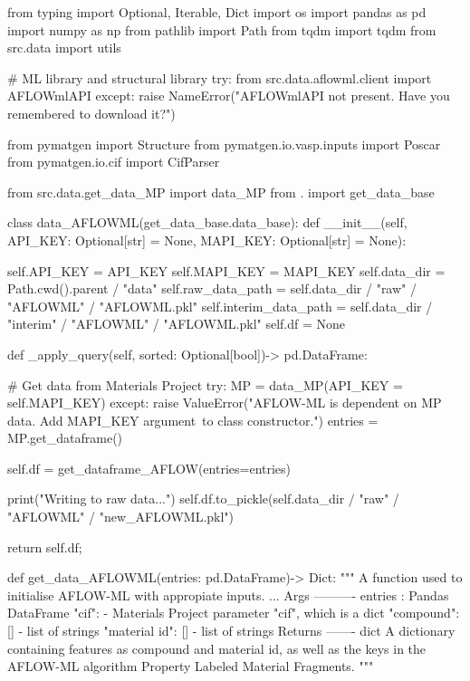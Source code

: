 from typing import Optional, Iterable, Dict
import os
import pandas as pd
import numpy as np
from pathlib import Path
from tqdm import tqdm
from src.data import utils

# ML library and structural library
try:
    from src.data.aflowml.client import AFLOWmlAPI
except:
    raise NameError("AFLOWmlAPI not present. Have you remembered to download it?")

from pymatgen import Structure
from pymatgen.io.vasp.inputs import Poscar
from pymatgen.io.cif import CifParser

from src.data.get_data_MP import data_MP
from . import get_data_base

class data_AFLOWML(get_data_base.data_base):
    def __init__(self, API_KEY: Optional[str] = None, MAPI_KEY: Optional[str] = None):

        self.API_KEY = API_KEY
        self.MAPI_KEY = MAPI_KEY
        self.data_dir = Path.cwd().parent / "data"
        self.raw_data_path = self.data_dir / "raw" / "AFLOWML" / "AFLOWML.pkl"
        self.interim_data_path = self.data_dir / "interim" / "AFLOWML" / "AFLOWML.pkl"
        self.df = None

    def _apply_query(self, sorted: Optional[bool])-> pd.DataFrame:

        # Get data from Materials Project
        try:
            MP = data_MP(API_KEY = self.MAPI_KEY)
        except:
            raise ValueError("AFLOW-ML is dependent on MP data. Add MAPI_KEY argument\
            to class constructor.")
        entries = MP.get_dataframe()

        self.df = get_dataframe_AFLOW(entries=entries)

        print("Writing to raw data...")
        self.df.to_pickle(self.data_dir / "raw"  / "AFLOWML" / "new_AFLOWML.pkl")

        return self.df;

    def get_data_AFLOWML(entries: pd.DataFrame)-> Dict:
        """
        A function used to initialise AFLOW-ML with appropiate inputs.
        ...
        Args
        ----------
        entries : Pandas DataFrame
        {
            "cif": {}
                - Materials Project parameter "cif", which is a dict
            "compound": []
                - list of strings
            "material id": []
                - list of strings
        }
        Returns
        -------
        dict
            A dictionary containing features as compound and material id,
            as well as the keys in the AFLOW-ML algorithm Property
            Labeled Material Fragments.
        """

